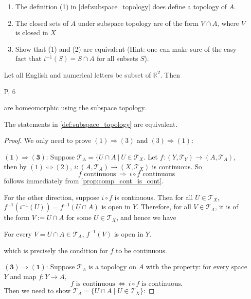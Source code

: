 \begin{example}
\begin{exercise} \label{ex:subspace_topology}
\begin{enumerate}
    \item The definition (1) in \autoref{def:subspace_topology} does define a topology of \(A\).
\item The closed sets of \(A\) under subspace topology are of the form \(V \cap  A\), where \(V\) is closed in \(X\)
\item Show that (1) and (2) are equivalent (Hint: one can make sure of the easy fact that \(
{i}^{-1}\left(S\right)  = S\cap A
\) for all subsets $S$).
\end{enumerate}
\end{exercise}

\begin{example} Let all English and numerical letters be subset of \({\mathbb{R}}^{2}\). Then
\begin{center}
P, 6
\end{center}
are homeomorphic using the subspace topology.
\end{example}

\begin{proposition} \label{prop:subspace_equivalent} The statements in \autoref{def:subspace_topology} are equivalent.
\end{proposition}
\begin{proof} 
We only need to prove $(1) \Rightarrow (3)$ and $(3) \Rightarrow (1)$:


\(\mathbf{(1) \Rightarrow (3)}\): Suppose \(\mathcal{T}_A = \{U \cap A\ |\ U \in \mathcal{T}_X\). Let \(f: (Y, \mathcal{T}_Y) \to (A, \mathcal{T}_A)\), then by $(1) \Leftrightarrow (2)$, $i: (A, \mathcal{T}_A) \to (X,\mathcal{T}_X)$ is continuous. So 
$$f \text{ continuous}\ \Rightarrow\ i \circ f \text{ continuous}$$
follows immediately from \autoref{prop:comp_cont_is_cont}.

For the other direction, suppose $i \circ f$ is continuous. Then
for all \(U \in \mathcal{T}_X\), \(f^{-1}(i^{-1}(U)) = f^{-1}(U \cap A)\) is open in \(Y\). Therefore, for all $V \in \mathcal{T}_A$, it is of the form $V := U \cap A$ for some $U \in \mathcal{T}_X$, and hence we have
\begin{center}
For every \(V = U \cap A \in \mathcal{T}_A\), \(f^{-1}(V)\) is open in \(Y\).
\end{center}
which is precisely the condition for $f$ to be continuous.


\(\mathbf{(3) \Rightarrow (1)}\): Suppose \(\mathcal{T}_A\) is a topology on \(A\) with the property: for every space \(Y\) and map \(f: Y \to A\),
\[
f \text{ is continuous}\ \Leftrightarrow\ i \circ f \text{ is continuous}.
\]
Then we need to show \(\mathcal{T}_A = \{U \cap A \mid U \in \mathcal{T}_X\}\):


\end{proof}
\end{example}

